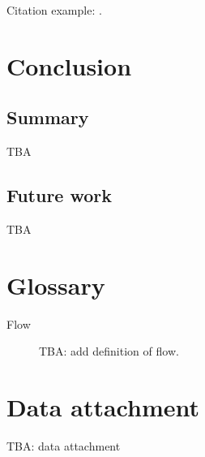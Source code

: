 \documentclass[
    digital,    %
    oneside,    %
    color,
    11pt,
    nocover,
    notable,
    nolof,
    nolot,
    final
]{fithesis3}
\begin{document}
Citation example: \cite{adaptive-practice}.


\chapter{Conclusion}
\label{chap:conclusion}

\section{Summary}
\label{sec:conclusion.summary}

TBA

\section{Future work}
\label{sec:conclusion.future-work}

TBA



\printbibliography[heading=bibintoc]

\appendix

\chapter{Glossary}
\label{chap:glossary}

\begin{description}
    \item[Flow] TBA: add definition of flow.
\end{description}

\chapter{Data attachment}
\label{chap:data}

TBA: data attachment
\end{document}
